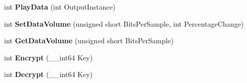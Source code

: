 \begin{DoxyCompactItemize}
\item 
\hypertarget{classcl_packet_ac8772a0beb5d23774c106322bd3c0f82}{
int {\bfseries PlayData} (int OutputInstance)}
\label{classcl_packet_ac8772a0beb5d23774c106322bd3c0f82}

\item 
\hypertarget{classcl_packet_acff29a88d706fd0f33e0b9d1bf22f1d3}{
int {\bfseries SetDataVolume} (unsigned short BitsPerSample, int PercentageChange)}
\label{classcl_packet_acff29a88d706fd0f33e0b9d1bf22f1d3}

\item 
\hypertarget{classcl_packet_a7d15c79a162ebd46add41f6bde24ffd5}{
int {\bfseries GetDataVolume} (unsigned short BitsPerSample)}
\label{classcl_packet_a7d15c79a162ebd46add41f6bde24ffd5}

\item 
\hypertarget{classcl_packet_a0ea9a7bade437e4fe872caef3ccb3d4c}{
int {\bfseries Encrypt} (\_\-\_\-int64 Key)}
\label{classcl_packet_a0ea9a7bade437e4fe872caef3ccb3d4c}

\item 
\hypertarget{classcl_packet_a8eab9b76f8aa9371d47b01a54f47e590}{
int {\bfseries Decrypt} (\_\-\_\-int64 Key)}
\label{classcl_packet_a8eab9b76f8aa9371d47b01a54f47e590}

\end{DoxyCompactItemize}
